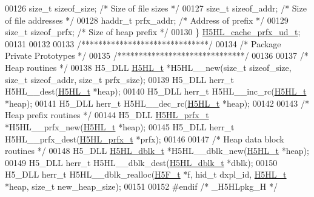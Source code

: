 \begin{DoxyCode}
00126     \textcolor{keywordtype}{size\_t} sizeof\_size;                 \textcolor{comment}{/* Size of file sizes */}
00127     \textcolor{keywordtype}{size\_t} sizeof\_addr;                 \textcolor{comment}{/* Size of file addresses */}
00128     haddr\_t prfx\_addr;                  \textcolor{comment}{/* Address of prefix */}
00129     \textcolor{keywordtype}{size\_t} sizeof\_prfx;                 \textcolor{comment}{/* Size of heap prefix */}
00130 \} \hyperlink{struct_h5_h_l__cache__prfx__ud__t}{H5HL\_cache\_prfx\_ud\_t};
00131 
00132 
00133 \textcolor{comment}{/******************************/}
00134 \textcolor{comment}{/* Package Private Prototypes */}
00135 \textcolor{comment}{/******************************/}
00136 
00137 \textcolor{comment}{/* Heap routines */}
00138 H5\_DLL \hyperlink{struct_h5_h_l__t}{H5HL\_t} *H5HL\_\_new(\textcolor{keywordtype}{size\_t} sizeof\_size, \textcolor{keywordtype}{size\_t} sizeof\_addr, \textcolor{keywordtype}{size\_t} prfx\_size);
00139 H5\_DLL herr\_t H5HL\_\_dest(\hyperlink{struct_h5_h_l__t}{H5HL\_t} *heap);
00140 H5\_DLL herr\_t H5HL\_\_inc\_rc(\hyperlink{struct_h5_h_l__t}{H5HL\_t} *heap);
00141 H5\_DLL herr\_t H5HL\_\_dec\_rc(\hyperlink{struct_h5_h_l__t}{H5HL\_t} *heap);
00142 
00143 \textcolor{comment}{/* Heap prefix routines */}
00144 H5\_DLL \hyperlink{struct_h5_h_l__prfx__t}{H5HL\_prfx\_t} *H5HL\_\_prfx\_new(\hyperlink{struct_h5_h_l__t}{H5HL\_t} *heap);
00145 H5\_DLL herr\_t H5HL\_\_prfx\_dest(\hyperlink{struct_h5_h_l__prfx__t}{H5HL\_prfx\_t} *prfx);
00146 
00147 \textcolor{comment}{/* Heap data block routines */}
00148 H5\_DLL \hyperlink{struct_h5_h_l__dblk__t}{H5HL\_dblk\_t} *H5HL\_\_dblk\_new(\hyperlink{struct_h5_h_l__t}{H5HL\_t} *heap);
00149 H5\_DLL herr\_t H5HL\_\_dblk\_dest(\hyperlink{struct_h5_h_l__dblk__t}{H5HL\_dblk\_t} *dblk);
00150 H5\_DLL herr\_t H5HL\_\_dblk\_realloc(\hyperlink{struct_h5_f__t}{H5F\_t} *f, hid\_t dxpl\_id, \hyperlink{struct_h5_h_l__t}{H5HL\_t} *heap, \textcolor{keywordtype}{size\_t} new\_heap\_size);
00151 
00152 \textcolor{preprocessor}{#endif }\textcolor{comment}{/* \_H5HLpkg\_H */}\textcolor{preprocessor}{}
\end{DoxyCode}

